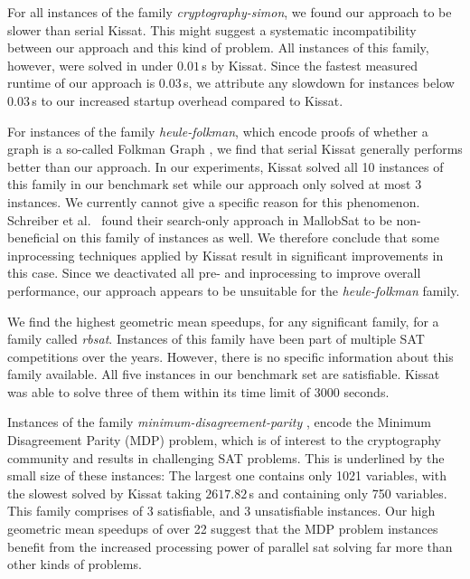 \documentclass[12pt,a4paper,twoside]{scrartcl}
\numberwithin{equation}{section}
\begin{document}
For all instances of the family \textit{cryptography-simon}, we found our approach to be slower than serial Kissat. This might suggest a systematic incompatibility between our approach and this kind of problem. All instances of this family, however, were solved in under $0.01\,$s by Kissat. Since the fastest measured runtime of our approach is $0.03\,$s, we attribute any slowdown for instances below $0.03\,$s to our increased startup overhead compared to Kissat.

For instances of the family \textit{heule-folkman}, which encode proofs of whether a graph is a so-called Folkman Graph \cite{satComp2024}, we find that serial Kissat generally performs better than our approach. In our experiments, Kissat solved all 10 instances of this family in our benchmark set while our approach only solved at most 3 instances. We currently cannot give a specific reason for this phenomenon. Schreiber et al.~\cite{searchOnlyPaper} found their search-only approach in MallobSat to be non-beneficial on this family of instances as well. We therefore conclude that some inprocessing techniques applied by Kissat result in significant improvements in this case. Since we deactivated all pre- and inprocessing to improve overall performance, our approach appears to be unsuitable for the \textit{heule-folkman} family.

We find the highest geometric mean speedups, for any significant family, for a family called \textit{rbsat}. Instances of this family have been part of multiple SAT competitions over the years. However, there is no specific information about this family available. All five instances in our benchmark set are satisfiable. Kissat was able to solve three of them within its time limit of 3000 seconds.

Instances of the family \textit{minimum-disagreement-parity} \cite{satComp2022}, encode the Minimum Disagreement Parity (MDP) problem, which is of interest to the cryptography community and results in challenging SAT problems. This is underlined by the small size of these instances: The largest one contains only 1021 variables, with the slowest solved by Kissat taking $2617.82\,$s and containing only 750 variables. This family comprises of 3 satisfiable, and 3 unsatisfiable instances. Our high geometric mean speedups of over 22 suggest that the MDP problem instances benefit from the increased processing power of parallel sat solving far more than other kinds of problems.
\end{document}
